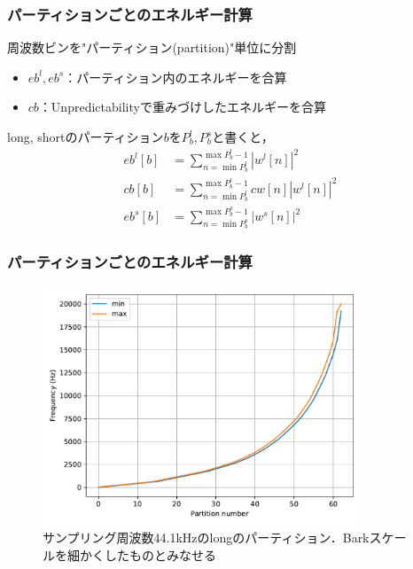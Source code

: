 \documentclass[14pt,xcolor=dvipsnames,table,dvipdfmx]{beamer}
\begin{document}
\begin{frame}[c]
    \frametitle{パーティションごとのエネルギー計算}
    周波数ビンを"パーティション(partition)"単位に分割
    \begin{itemize}
        \item $eb^{l}, eb^{s}$：パーティション内のエネルギーを合算
        \item $cb$：Unpredictabilityで重みづけしたエネルギーを合算
    \end{itemize}
    long, shortのパーティション$b$を$P^{l}_{b}, P^{s}_{b}$と書くと，
    \small
    \begin{align}
        eb^{l}[b] &= \sum_{n = \min P^{l}_{b}}^{\max P^{l}_{b} - 1} |w^{l}[n]|^{2} \\
        cb[b] &= \sum_{n = \min P^{l}_{b}}^{\max P^{l}_{b} - 1} cw[n] |w^{l}[n]|^{2} \\
        eb^{s}[b] &= \sum_{n = \min P^{s}_{b}}^{\max P^{s}_{b} - 1} |w^{s}[n]|^{2}
    \end{align}
\end{frame}

\begin{frame}[c]
    \frametitle{パーティションごとのエネルギー計算}
    \begin{figure}
        \includegraphics[width=95mm]{./figs/partion_frequency_long44100Hz.pdf}
        \caption*{サンプリング周波数44.1kHzのlongのパーティション．Barkスケールを細かくしたものとみなせる}
    \end{figure}
\end{frame}
\end{document}

